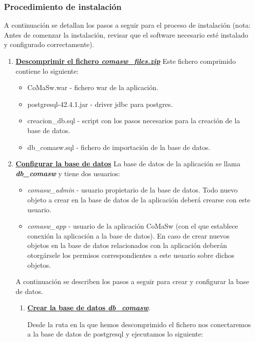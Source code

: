 \subsubsection{Procedimiento de instalación}
\label{sub:proceso-instalacion}
A continuación se detallan los pasos a seguir para el proceso de instalación (nota: Antes de comenzar la instalación, revisar que el software necesario esté instalado y configurado correctamente).
\begin{enumerate}
\item \underline{\textbf{Descomprimir el fichero \emph{comasw\_files.zip}}} \newline
Este fichero comprimido contiene lo siguiente:
	\begin{itemize}
		\item CoMaSw.war - fichero war de la aplicación.
		\item postgresql-42.4.1.jar - driver jdbc para postgres.
		\item creacion\_db.sql - script con los pasos necesarios para la creación de la base de datos.
		\item db\_comasw.sql - fichero de importación de la base de datos.
	\end{itemize}

\item \underline{\textbf{Configurar la base de datos}}\newline
La base de datos de la aplicación se llama \emph{\textbf{db\_comasw}} y tiene dos usuarios:
	\begin{itemize}
		\item \emph{comasw\_admin} - usuario propietario de la base de datos. Todo nuevo objeto a crear en la base de datos de la aplicación deberá crearse con este usuario.
		\item \emph{comasw\_app} - usuario de la aplicación CoMaSw (con el que establece conexión la aplicación a la base de datos). En caso de crear nuevos objetos en la base de datos relacionados con la aplicación deberán otorgársele los permisos correspondientes a este usuario sobre dichos objetos.
	\end{itemize}
A continuación se describen los pasos a seguir para crear y configurar la base de datos.	
	\begin{enumerate}
		\item \underline{\textbf{Crear la base de datos \emph{\textbf{db\_comasw}}}}.\newline

Desde la ruta en la que hemos descomprimido el fichero nos conectaremos a la base de datos de postgresql y ejecutamos lo siguiente:\newline


\end{enumerate}
\end{enumerate}
